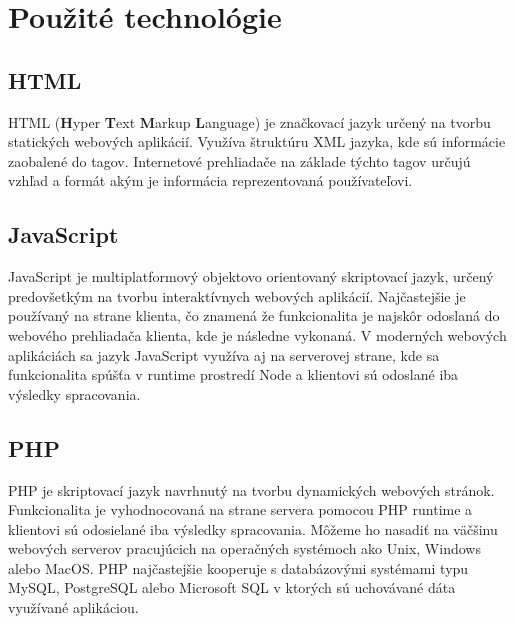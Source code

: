 \section{Použité technológie}

\subsection{HTML}
HTML (\textbf{H}yper \textbf{T}ext \textbf{M}arkup \textbf{L}anguage) je značkovací jazyk určený na tvorbu statických webových aplikácií. Využíva štruktúru XML jazyka, kde sú informácie zaobalené do tagov. Internetové prehliadače na základe týchto tagov určujú vzhľad a formát akým je informácia reprezentovaná používateľovi. 

\subsection{JavaScript}
JavaScript je multiplatformový objektovo orientovaný skriptovací jazyk, určený predovšetkým na tvorbu interaktívnych webových aplikácií. Najčastejšie je používaný na strane klienta, čo znamená že funkcionalita je najskôr odoslaná do webového prehliadača klienta, kde je následne vykonaná. V moderných webových aplikáciách sa jazyk JavaScript využíva aj na serverovej strane, kde sa funkcionalita spúšťa v runtime prostredí Node a klientovi sú odoslané iba výsledky spracovania. 

\subsection{PHP}
PHP je skriptovací jazyk navrhnutý na tvorbu dynamických webových stránok. Funkcionalita je vyhodnocovaná na strane servera pomocou PHP runtime a klientovi sú odosielané iba výsledky spracovania. Môžeme ho nasadiť na väčšinu webových serverov pracujúcich na operačných systémoch ako Unix, Windows alebo MacOS. PHP najčastejšie kooperuje s databázovými systémami typu MySQL, PostgreSQL alebo Microsoft SQL v ktorých sú uchovávané dáta využívané aplikáciou.

